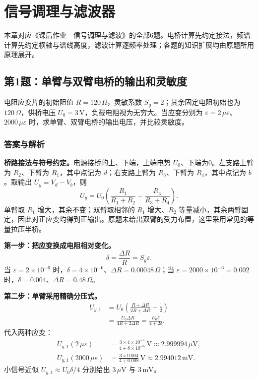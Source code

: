 \chapter{信号调理与滤波器}
\label{chap:hw-conditioning}

\noindent 本章对应《课后作业—信号调理与滤波》的全部6题。电桥计算先约定接法，频谱计算先约定横轴与谱线高度，滤波计算逐频率处理；各题的知识扩展均由原题所用原理展开。


\section{第1题：单臂与双臂电桥的输出和灵敏度}
\label{hw:5-1}

\begin{hwquestion}
电阻应变片的初始阻值 $R=120\,\Omega$，灵敏系数 $S_g=2$；其余固定电阻初始也为 $120\,\Omega$，供桥电压 $U_0=3\,\mathrm V$，负载电阻视为无穷大。当应变分别为 $\varepsilon=2\,\mu\varepsilon$、$2000\,\mu\varepsilon$ 时，求单臂、双臂电桥的输出电压，并比较灵敏度。
\end{hwquestion}

\subsection*{答案与解析}
\textbf{桥路接法与符号约定。}电源接桥的上、下端，上端电势 $U_0$、下端为0。左支路上臂为 $R_2$、下臂为 $R_1$，其中点记为 $d$；右支路上臂为 $R_3$、下臂为 $R_4$，其中点记为 $b$。取输出 $U_y=V_d-V_b$，则
\[
U_y=U_0\left(\frac{R_1}{R_1+R_2}-\frac{R_4}{R_3+R_4}\right).
\]
单臂取 $R_1$ 增大，其余不变；双臂取相邻的 $R_1$ 增大、$R_2$ 等量减小，其余两臂固定，因此对正应变均得到正输出。原题未给出双臂的受力布置，这里采用常见的等量拉压半桥。

\textbf{第一步：把应变换成电阻相对变化。}
\[
\delta=\frac{\Delta R}{R}=S_g\varepsilon.
\]
当 $\varepsilon=2\times10^{-6}$ 时，$\delta=4\times10^{-6}$、$\Delta R=0.00048\,\Omega$；当 $\varepsilon=2000\times10^{-6}=0.002$ 时，$\delta=0.004$、$\Delta R=0.48\,\Omega$。

\textbf{第二步：单臂采用精确分压式。}
\begin{align*}
U_{y,1}&=U_0\left(\frac{R+\Delta R}{2R+\Delta R}-\frac12\right)\\
&=\boxed{\frac{U_0\Delta R}{4R+2\Delta R}
=\frac{U_0\delta}{4+2\delta}}.
\end{align*}
代入两种应变：
\begin{align*}
U_{y,1}(2\,\mu\varepsilon)
&=\frac{3\times4\times10^{-6}}{4+8\times10^{-6}}\,\mathrm V
\approx\boxed{2.999994\,\mu\mathrm V},\\
U_{y,1}(2000\,\mu\varepsilon)
&=\frac{3\times0.004}{4+0.008}\,\mathrm V
\approx\boxed{2.994012\,\mathrm{mV}}.
\end{align*}
小信号近似 $U_{y,1}\approx U_0\delta/4$ 分别给出 $3\,\mu\mathrm V$ 与 $3\,\mathrm{mV}$。

